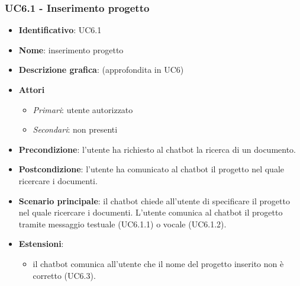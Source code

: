 \subsubsection{UC6.1 - Inserimento progetto}
\begin{itemize}
    \item \textbf{Identificativo}: UC6.1
    \item \textbf{Nome}: inserimento progetto
    \item \textbf{Descrizione grafica}: (approfondita in UC6)
    \item \textbf{Attori}
 \begin{itemize} 
    \item \textit{Primari}: utente autorizzato
    \item \textit{Secondari}: non presenti
 \end{itemize}
 \item \textbf{Precondizione}: l'utente ha richiesto al chatbot la ricerca di un documento.
 \item \textbf{Postcondizione}:  l'utente ha comunicato al chatbot il progetto nel quale ricercare i documenti.
 \item \textbf{Scenario principale}: il chatbot chiede all'utente di specificare il progetto nel quale ricercare i documenti. L'utente comunica al chatbot il progetto tramite messaggio testuale (UC6.1.1) o vocale (UC6.1.2).
 \item \textbf{Estensioni}: 
 \begin{itemize} 
    \item il chatbot comunica all'utente che il nome del progetto inserito non è corretto (UC6.3).
 \end{itemize}
\end{itemize}

